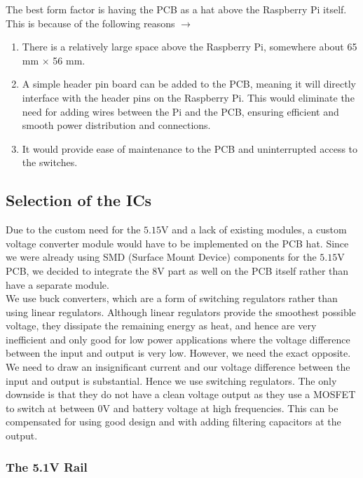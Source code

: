\documentclass[12pt,a4paper]{article}
\begin{document}
The best form factor is having the PCB as a hat above the Raspberry Pi itself. This is because of the following reasons $\rightarrow$

\begin{enumerate}
\item There is a relatively large space above the Raspberry Pi, somewhere about 65 mm $\times$ 56 mm.
\item A simple header pin board can be added to the PCB, meaning it will directly interface with the header pins on the Raspberry Pi. This would eliminate the need for adding wires between the Pi and the PCB, ensuring efficient and smooth power distribution and connections.
\item It would provide ease of maintenance to the PCB and uninterrupted access to the switches.
\end{enumerate}

\subsection{Selection of the ICs}

Due to the custom need for the $5.15$V and a lack of existing modules, a custom voltage converter module would have to be implemented on the PCB hat. Since we were already using SMD (Surface Mount Device) components for the $5.15$V PCB, we decided to integrate the $8$V part as well on the PCB itself rather than have a separate module. \\

We use buck converters, which are a form of switching regulators rather than using linear regulators. Although linear regulators provide the smoothest possible voltage, they dissipate the remaining energy as heat, and hence are very inefficient and only good for low power applications where the voltage difference between the input and output is very low. However, we need the exact opposite. We need to draw an insignificant current and our voltage difference between the input and output is substantial. Hence we use switching regulators. The only downside is that they do not have a clean voltage output as they use a MOSFET to switch at between $0$V and battery voltage at high frequencies. This can be compensated for using good design and with adding filtering capacitors at the output.

\subsubsection{The 5.1V Rail}
\end{document}
